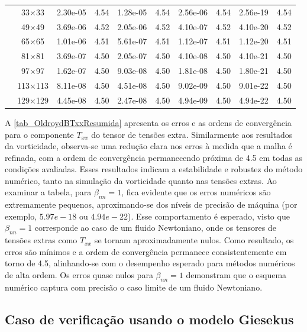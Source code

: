 \begin{table}[H]
{\begin{tabular*}{\textwidth}{@{\extracolsep\fill}c|c|cc|cc|cc|cc@{}}
                & 33$\times$33 & 2.30e-05 & 4.54 & 1.28e-05 & 4.54 & 2.56e-06 & 4.54 & 2.56e-19 & 4.54 \\
                & 49$\times$49 & 3.69e-06 & 4.52 & 2.05e-06 & 4.52 & 4.10e-07 & 4.52 & 4.10e-20 & 4.52 \\
                & 65$\times$65 & 1.01e-06 & 4.51 & 5.61e-07 & 4.51 & 1.12e-07 & 4.51 & 1.12e-20 & 4.51 \\
                & 81$\times$81 & 3.69e-07 & 4.50 & 2.05e-07 & 4.50 & 4.10e-08 & 4.50 & 4.10e-21 & 4.50 \\
                & 97$\times$97 & 1.62e-07 & 4.50 & 9.03e-08 & 4.50 & 1.81e-08 & 4.50 & 1.80e-21 & 4.50 \\
                & 113$\times$113 & 8.11e-08 & 4.50 & 4.51e-08 & 4.50 & 9.02e-09 & 4.50 & 9.01e-22 & 4.50 \\
                & 129$\times$129 & 4.45e-08 & 4.50 & 2.47e-08 & 4.50 & 4.94e-09 & 4.50 & 4.94e-22 & 4.50 \\
                \bottomrule
            \end{tabular*}
		}{
		\fdadospesquisa
	}
\end{table}

A \autoref{tab_OldroydBTxxResumida} apresenta os erros e as ordens de convergência para o componente $T_{xx}$ do tensor de tensões extra. Similarmente aos resultados da vorticidade, observa-se uma redução clara nos erros à medida que a malha é refinada, com a ordem de convergência permanecendo próxima de 4.5 em todas as condições avaliadas. Esses resultados indicam a estabilidade e robustez do método numérico, tanto na simulação da vorticidade quanto nas tensões extras. Ao examinar a tabela, para $\beta_{nn} = 1$, fica evidente que os erros numéricos são extremamente pequenos, aproximando-se dos níveis de precisão de máquina (por exemplo, $5.97e-18$ ou $4.94e-22$). Esse comportamento é esperado, visto que $\beta_{nn} = 1$ corresponde ao caso de um fluido Newtoniano, onde os tensores de tensões extras como $T_{xx}$ se tornam aproximadamente nulos. Como resultado, os erros são mínimos e a ordem de convergência permanece consistentemente em torno de 4.5, alinhando-se com o desempenho esperado para métodos numéricos de alta ordem. Os erros quase nulos para $\beta_{nn} = 1$ demonstram que o esquema numérico captura com precisão o caso limite de um fluido Newtoniano.

\subsection{Caso de verificação usando o modelo Giesekus}

